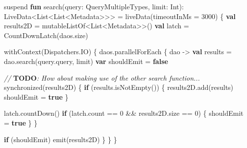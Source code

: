 \documentclass[
]{article}
\newenvironment{Shaded}{}{}
\newcommand{\AlertTok}[1]{\textcolor[rgb]{1.00,0.00,0.00}{\textbf{#1}}}
\newcommand{\CommentTok}[1]{\textcolor[rgb]{0.38,0.63,0.69}{\textit{#1}}}
\newcommand{\ControlFlowTok}[1]{\textcolor[rgb]{0.00,0.44,0.13}{\textbf{#1}}}
\newcommand{\DataTypeTok}[1]{\textcolor[rgb]{0.56,0.13,0.00}{#1}}
\newcommand{\DecValTok}[1]{\textcolor[rgb]{0.25,0.63,0.44}{#1}}
\newcommand{\FunctionTok}[1]{\textcolor[rgb]{0.02,0.16,0.49}{#1}}
\newcommand{\KeywordTok}[1]{\textcolor[rgb]{0.00,0.44,0.13}{\textbf{#1}}}
\newcommand{\NormalTok}[1]{#1}
\newcommand{\OperatorTok}[1]{\textcolor[rgb]{0.40,0.40,0.40}{#1}}
\newcommand{\VariableTok}[1]{\textcolor[rgb]{0.10,0.09,0.49}{#1}}
\begin{document}
\begin{Shaded}
\begin{Highlighting}[]
\NormalTok{suspend }\KeywordTok{fun} \FunctionTok{search}\OperatorTok{(}\VariableTok{query}\OperatorTok{:} \DataTypeTok{QueryMultipleTypes}\OperatorTok{,} \VariableTok{limit}\OperatorTok{:} \DataTypeTok{Int}\OperatorTok{):}
        \DataTypeTok{LiveData}\OperatorTok{\textless{}}\DataTypeTok{List}\OperatorTok{\textless{}}\DataTypeTok{List}\OperatorTok{\textless{}}\DataTypeTok{Metadata}\OperatorTok{\textgreater{}\textgreater{}\textgreater{}} \OperatorTok{=}\NormalTok{ liveData}\OperatorTok{(}\NormalTok{timeoutInMs }\OperatorTok{=} \DecValTok{3000}\OperatorTok{)} \OperatorTok{\{}
    \KeywordTok{val} \VariableTok{results2D} \OperatorTok{=}\NormalTok{ mutableListOf}\OperatorTok{\textless{}}\NormalTok{List}\OperatorTok{\textless{}}\NormalTok{Metadata}\OperatorTok{\textgreater{}\textgreater{}()}
    \KeywordTok{val} \VariableTok{latch} \OperatorTok{=}\NormalTok{ CountDownLatch}\OperatorTok{(}\NormalTok{daos}\OperatorTok{.}\NormalTok{size}\OperatorTok{)}

\NormalTok{    withContext}\OperatorTok{(}\NormalTok{Dispatchers}\OperatorTok{.}\NormalTok{IO}\OperatorTok{)} \OperatorTok{\{}
\NormalTok{        daos}\OperatorTok{.}\NormalTok{parallelForEach }\OperatorTok{\{}\NormalTok{ dao }\OperatorTok{{-}\textgreater{}}
            \KeywordTok{val} \VariableTok{results} \OperatorTok{=}\NormalTok{ dao}\OperatorTok{.}\NormalTok{search}\OperatorTok{(}\NormalTok{query}\OperatorTok{.}\NormalTok{query}\OperatorTok{,}\NormalTok{ limit}\OperatorTok{)}
            \KeywordTok{var} \VariableTok{shouldEmit} \OperatorTok{=} \KeywordTok{false}

            \CommentTok{// }\AlertTok{TODO}\CommentTok{: How about making use of the other search function...}
\NormalTok{            synchronized}\OperatorTok{(}\NormalTok{results2D}\OperatorTok{)} \OperatorTok{\{}
                \ControlFlowTok{if} \OperatorTok{(}\NormalTok{results}\OperatorTok{.}\NormalTok{isNotEmpty}\OperatorTok{())} \OperatorTok{\{}
\NormalTok{                    results2D}\OperatorTok{.}\NormalTok{add}\OperatorTok{(}\NormalTok{results}\OperatorTok{)}
\NormalTok{                    shouldEmit }\OperatorTok{=} \KeywordTok{true}
                \OperatorTok{\}}

\NormalTok{                latch}\OperatorTok{.}\NormalTok{countDown}\OperatorTok{()}
                \ControlFlowTok{if} \OperatorTok{(}\NormalTok{latch}\OperatorTok{.}\NormalTok{count }\OperatorTok{==} \DecValTok{0} \OperatorTok{\&\&}\NormalTok{ results2D}\OperatorTok{.}\NormalTok{size }\OperatorTok{==} \DecValTok{0}\OperatorTok{)} \OperatorTok{\{}
\NormalTok{                    shouldEmit }\OperatorTok{=} \KeywordTok{true}
                \OperatorTok{\}}
            \OperatorTok{\}}

            \ControlFlowTok{if} \OperatorTok{(}\NormalTok{shouldEmit}\OperatorTok{)}\NormalTok{ emit}\OperatorTok{(}\NormalTok{results2D}\OperatorTok{)}
        \OperatorTok{\}}
    \OperatorTok{\}}
\OperatorTok{\}}
\end{Highlighting}
\end{Shaded}
\end{document}

